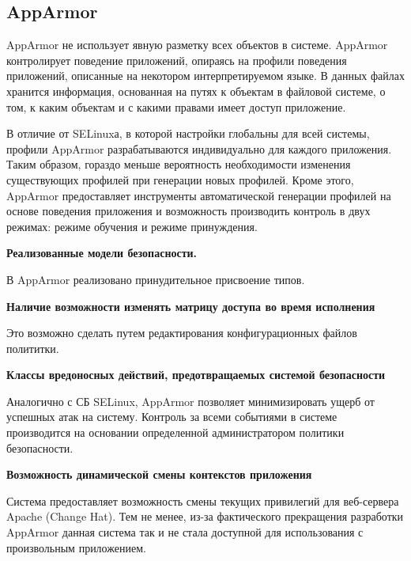 \bigskip
\subsection{AppArmor}

AppArmor не использует
явную разметку всех объектов в системе.
AppArmor контролирует поведение 
приложений, опираясь на профили поведения
приложений, описанные на некотором интерпретируемом
языке. 
В данных файлах хранится информация, основанная на 
путях к объектам в файловой системе, о том, к каким 
объектам и с какими правами имеет доступ приложение. 

В отличие от SELinuxа, 
в которой настройки глобальны для всей системы, профили 
AppArmor разрабатываются индивидуально для каждого 
приложения.
Таким образом, гораздо меньше вероятность 
необходимости изменения существующих профилей при 
генерации новых профилей. Кроме этого, 
AppArmor предоставляет инструменты 
автоматической генерации профилей на основе поведения 
приложения и возможность производить контроль в двух 
режимах: режиме обучения и режиме принуждения. 

{\bfseries Реализованные модели безопасности.} 

В AppArmor реализовано принудительное присвоение типов. 

{\bfseries Наличие возможности изменять матрицу доступа 
	во время исполнения} 

Это возможно сделать путем редактирования конфигурационных
файлов полититки. 

\bigskip
{\bfseries Классы вредоносных действий, предотвращаемых
	системой безопасности} 

Аналогично с СБ SELinux, AppArmor позволяет 
минимизировать ущерб от успешных атак на систему. 
Контроль за всеми событиями в системе производится 
на основании определенной администратором политики 
безопасности. 

\bigskip
{\bfseries Возможность динамической смены 
контекстов приложения} 

Система предоставляет возможность смены
текущих привилегий для веб-сервера Apache
(Change Hat). Тем не менее, из-за фактического
прекращения разработки AppArmor данная 
система так и не стала доступной для использования
с произвольным приложением. 


